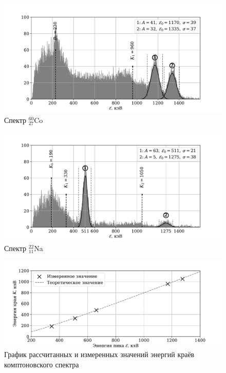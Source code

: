 \documentclass[a4paper,12pt]{article} %
\begin{document}
\begin{figure}
\centering
\includegraphics[width=\textwidth]{spectrum_co.pdf}
\caption{Спектр $^{60}_{27}$Co}
\label{fig:co}
\end{figure}

\begin{figure}
\centering
\includegraphics[width=\textwidth]{spectrum_na.pdf}
\caption{Спектр $^{22}_{11}$Na}
\label{fig:na}
\end{figure}

\begin{figure}
\centering
\includegraphics[width=\textwidth]{compton.pdf}
\caption{\centering График рассчитанных и измеренных значений энергий краёв комптоновского спектра}
\label{fig:compton}
\end{figure}
\end{document}
